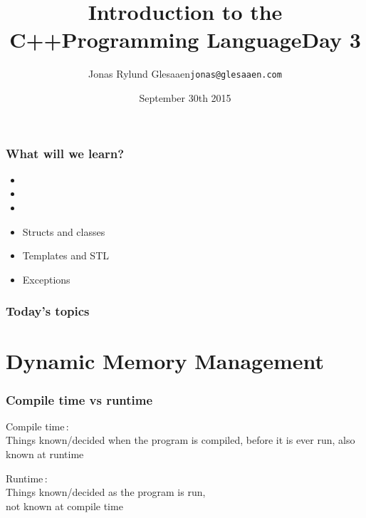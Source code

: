 \documentclass[14pt,a4paper,dvipsnames,usenames]{beamer}
\title[C++ Day3]{Introduction to the C++\newline{}Programming Language\newline{}\newline{}\fontsize{16pt}{16pt}\selectfont{}Day 3}
\author{\texorpdfstring{%
    Jonas Rylund Glesaaen\newline\fontsize{12pt}{12pt}\selectfont\texttt{jonas@glesaaen.com}%
  }{%
    Jonas Rylund Glesaaen}}
\date{September 30th 2015}
\begin{document}
\begin{frame}
\titlepage
\end{frame}

\begin{frame}
  \frametitle{What will we learn?}

  \begin{itemize}
    \setlength\itemsep{.5em}
    \item {}
    \item {}
    \item {}
    \item Structs and classes 
    \item Templates and STL 
    \item Exceptions 
  \end{itemize}
\end{frame}

\begin{frame}
  \frametitle{Today's topics}

  \tableofcontents
  
\end{frame}

\section{Dynamic Memory Management}

\frame[plain]{\sectionpage}

\begin{frame}[plain]
  \nointerlineskip
\end{frame}

\begin{frame}
  \frametitle{Compile time \:vs\: runtime}

  {\large\color{FeebleWeek}Compile time}\,:\\[3pt]
  Things known/decided when the program is compiled, before it is ever run, also known at runtime


  \vspace{1em}
  {\large\color{Marty}Runtime}\,:\\[3pt]
  Things known/decided as the program is run,\\not known at compile time
  
\end{frame}
\end{document}

